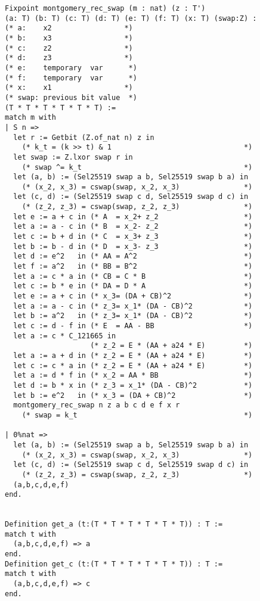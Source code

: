 \begin{lstlisting}[language=Coq]
Fixpoint montgomery_rec_swap (m : nat) (z : T')
(a: T) (b: T) (c: T) (d: T) (e: T) (f: T) (x: T) (swap:Z) :
(* a:    x2                 *)
(* b:    x3                 *)
(* c:    z2                 *)
(* d:    z3                 *)
(* e:    temporary  var      *)
(* f:    temporary  var      *)
(* x:    x1                 *)
(* swap: previous bit value  *)
(T * T * T * T * T * T) :=
match m with
| S n =>
  let r := Getbit (Z.of_nat n) z in
    (* k_t = (k >> t) & 1                               *)
  let swap := Z.lxor swap r in
    (* swap ^= k_t                                      *)
  let (a, b) := (Sel25519 swap a b, Sel25519 swap b a) in
    (* (x_2, x_3) = cswap(swap, x_2, x_3)               *)
  let (c, d) := (Sel25519 swap c d, Sel25519 swap d c) in
    (* (z_2, z_3) = cswap(swap, z_2, z_3)               *)
  let e := a + c in (* A  = x_2+ z_2                    *)
  let a := a - c in (* B  = x_2- z_2                    *)
  let c := b + d in (* C  = x_3+ z_3                    *)
  let b := b - d in (* D  = x_3- z_3                    *)
  let d := e^2   in (* AA = A^2                         *)
  let f := a^2   in (* BB = B^2                         *)
  let a := c * a in (* CB = C * B                       *)
  let c := b * e in (* DA = D * A                       *)
  let e := a + c in (* x_3= (DA + CB)^2                 *)
  let a := a - c in (* z_3= x_1* (DA - CB)^2            *)
  let b := a^2   in (* z_3= x_1* (DA - CB)^2            *)
  let c := d - f in (* E  = AA - BB                     *)
  let a := c * C_121665 in
                    (* z_2 = E * (AA + a24 * E)         *)
  let a := a + d in (* z_2 = E * (AA + a24 * E)         *)
  let c := c * a in (* z_2 = E * (AA + a24 * E)         *)
  let a := d * f in (* x_2 = AA * BB                    *)
  let d := b * x in (* z_3 = x_1* (DA - CB)^2           *)
  let b := e^2   in (* x_3 = (DA + CB)^2                *)
  montgomery_rec_swap n z a b c d e f x r
    (* swap = k_t                                       *)

| 0%nat =>
  let (a, b) := (Sel25519 swap a b, Sel25519 swap b a) in
    (* (x_2, x_3) = cswap(swap, x_2, x_3)               *)
  let (c, d) := (Sel25519 swap c d, Sel25519 swap d c) in
    (* (z_2, z_3) = cswap(swap, z_2, z_3)               *)
  (a,b,c,d,e,f)
end.


Definition get_a (t:(T * T * T * T * T * T)) : T :=
match t with
  (a,b,c,d,e,f) => a
end.
Definition get_c (t:(T * T * T * T * T * T)) : T :=
match t with
  (a,b,c,d,e,f) => c
end.
\end{lstlisting}

